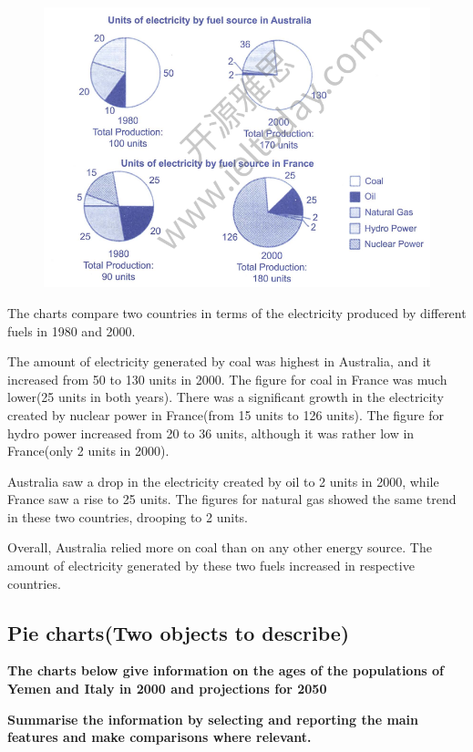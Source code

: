 \documentclass[conference]{IEEEtran}
\begin{document}
\begin{figure}[htbp]
    \centerline{\includegraphics[width=1.1\columnwidth]{images/Screenshot from 2022-12-04 21-53-13.png}}
\end{figure}

The charts compare two countries in terms of the electricity produced by different fuels in 1980 and 2000.

The amount of electricity generated by coal was highest in Australia, and it increased from 50 to 130 units in 2000.
The figure for coal in France was much lower(25 units in both years).
There was a significant growth in the electricity created by nuclear power in France(from 15 units to 126 units).
The figure for hydro power increased from 20 to 36 units, although it was rather low in France(only 2 units in 2000).

Australia saw a drop in the electricity created by oil to 2 units in 2000, while France saw a rise to 25 units.
The figures for natural gas showed the same trend in these two countries, drooping to 2 units.

Overall, Australia relied more on coal than on any other energy source.
The amount of electricity generated by these two fuels increased in respective countries.

\subsection{Pie charts(Two objects to describe)}
\textbf{The charts below give information on the ages of the populations of Yemen and Italy
in 2000 and projections for 2050}

\textbf{Summarise the information by selecting and reporting the main features and make
comparisons where relevant.}
\end{document}
